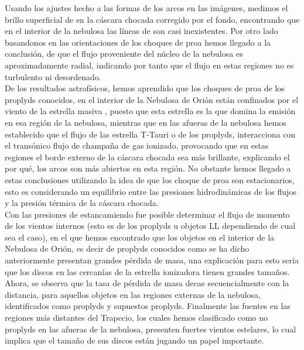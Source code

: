 Usando  los ajustes hecho a las formas de los arcos en las imágenes, medimos el brillo superficial de \ha{} en la cáscara chocada corregido por el fondo, encontrando que en el interior de la nebulosa las líneas de \nii{} son casi inexistentes. Por otro lado basandonos en las orientaciones de los choques de proa hemos llegado a la conclusión, de que el flujo proveniente del núcleo de la nebulosa es aproximadamente radial, indicando por tanto que el flujo en estas regiones no es turbulento ni desordenado. \\       

De los resultados astrofísicos, hemos aprendido que los choques de proa de los proplyds conocidos, en el interior de la Nebulosa de Orión están confinados por el viento de la estrella masiva \thC{}, puesto que esta estrella es la que domina la emisión en esa región de la nebulosa, mientras que en las afueras de la nebulosa hemos establecido que el flujo de las estrella T-Tauri o de los proplyds, interacciona con el transónico flujo de champaña de gas ionizado, provocando  que en estas regiones el borde  externo de la cáscara chocada sea más brillante, explicando el por qué, los arcos son más abiertos en esta región. No obstante hemos llegado a estas conclusiones utilizando la idea de que los choque de proa son estacionarios, esto es considerando un equilibrio entre las presiones hidrodinámicas de los flujos y la presión térmica de la cáscara chocada. \\

Con las presiones de estancamiendo fue posible determinar el flujo de momento de los vientos internos (esto es de los proplyds u objetos LL dependiendo de cual sea el caso), en el que hemos encontrado que los objetos en el interior de la Nebulosa de Orión, es decir de proplyds conocidos como se ha dicho anteriormente presentan grandes pérdida de masa, una explicación para esto sería que los discos en las cercanías de la estrella ionizadora tienen grandes tamaños. Ahora,  se observa que la tasa de pérdida de masa decae secuencialmente con la distancia, para aquellos objetos  en las regiones externas de la nebulosa, identificados como proplyds y supuestos proplyds. Finalmente las fuentes en las regiones más distantes del Trapecio, los cuales hemos clasificado como no proplyds en las afueras de la nebulosa, presenten fuertes vientos estelares, lo cual implica que el tamaño de sus discos están jugando un papel importante.\\

